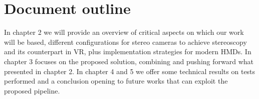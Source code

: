 \section{Document outline}
In chapter 2 we will provide an overview of critical aspects on which our work will be based, different configurations for stereo cameras to achieve stereoscopy and its counterpart in VR, plus implementation strategies for modern HMDs. In chapter 3 focuses on the proposed solution, combining and pushing forward what presented in chapter 2. In chapter 4 and 5 we offer some technical results on tests performed and a conclusion opening to future works that can exploit the proposed pipeline.